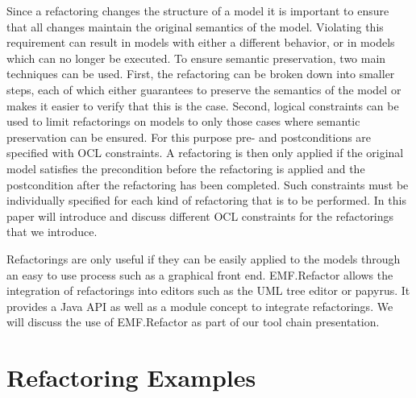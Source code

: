 \documentclass{llncs}
\begin{document}
Since a refactoring changes the structure of a model it is important to ensure that all changes maintain the original 
semantics of the model. Violating this requirement can result in models with either a different behavior, or in models 
which can no longer be executed. To ensure semantic preservation, two main techniques can be used. First, the refactoring 
can be broken down into smaller steps, each of which either guarantees to preserve the semantics of the model or makes it 
easier to verify that this is the case. Second, logical constraints can be used to limit refactorings on models to only 
those cases where semantic preservation can be ensured. For this purpose pre- and postconditions are specified with OCL 
constraints. A refactoring is then only applied if the original model satisfies the precondition before the refactoring is 
applied and the postcondition after the refactoring has been completed. Such constraints must be individually specified 
for each kind of refactoring that is to be performed. In this paper will introduce and discuss different OCL constraints 
for  the refactorings that we introduce.

Refactorings are only useful if they can be easily applied to the models through an easy to use process such as a 
graphical front end. EMF.Refactor allows the integration of refactorings into editors such as the UML tree editor or 
papyrus. It provides a Java API as well as a module concept to integrate refactorings. We will discuss the use of 
EMF.Refactor as part of our tool chain presentation.


\section{Refactoring Examples}
\label{refactoring-examples}
\end{document}
